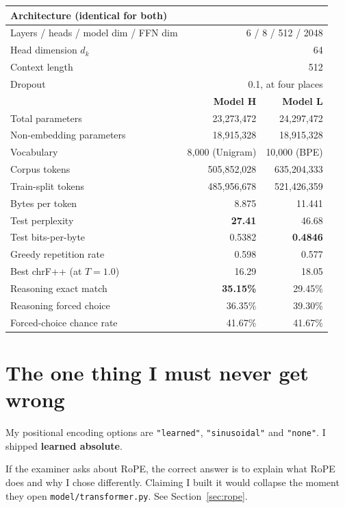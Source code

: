 \documentclass[11pt]{report}
\newcommand{\p}[1]{\texttt{#1}}
\begin{document}
\begin{center}
\begin{tabular}{@{}lrr@{}}
\toprule
\textbf{Architecture (identical for both)} & \multicolumn{2}{c}{} \\
\midrule
Layers / heads / model dim / FFN dim & \multicolumn{2}{r}{6 / 8 / 512 / 2048} \\
Head dimension $d_k$ & \multicolumn{2}{r}{64} \\
Context length & \multicolumn{2}{r}{512} \\
Dropout & \multicolumn{2}{r}{0.1, at four places} \\
\midrule
 & \textbf{Model H} & \textbf{Model L} \\
\midrule
Total parameters & 23,273,472 & 24,297,472 \\
Non-embedding parameters & 18,915,328 & 18,915,328 \\
Vocabulary & 8,000 (Unigram) & 10,000 (BPE) \\
Corpus tokens & 505,852,028 & 635,204,333 \\
Train-split tokens & 485,956,678 & 521,426,359 \\
Bytes per token & 8.875 & 11.441 \\
Test perplexity & \textbf{27.41} & 46.68 \\
Test bits-per-byte & 0.5382 & \textbf{0.4846} \\
Greedy repetition rate & 0.598 & 0.577 \\
Best chrF++ (at $T=1.0$) & 16.29 & 18.05 \\
Reasoning exact match & \textbf{35.15\%} & 29.45\% \\
Reasoning forced choice & 36.35\% & 39.30\% \\
Forced-choice chance rate & 41.67\% & 41.67\% \\
\bottomrule
\end{tabular}
\end{center}

\section{The one thing I must never get wrong}

\begin{warnbox}
My positional encoding options are \p{"learned"}, \p{"sinusoidal"} and
\p{"none"}. I shipped \textbf{learned absolute}.

If the examiner asks about RoPE, the correct answer is to explain what RoPE does
and why I chose differently. Claiming I built it would collapse the moment they
open \p{model/transformer.py}. See Section~\ref{sec:rope}.
\end{warnbox}
\end{document}
